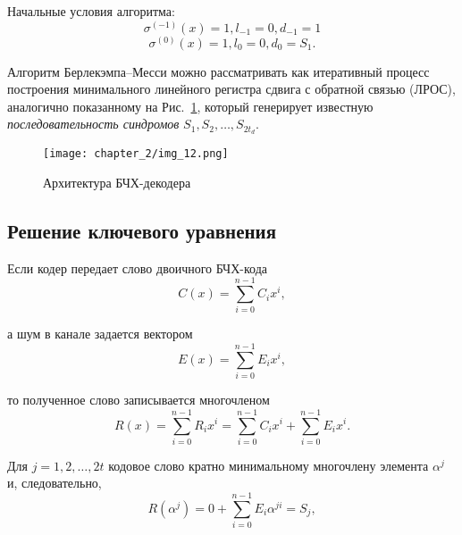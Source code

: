 Начальные условия алгоритма:
$$\sigma^{(-1)}(x)=1, l_{-1}=0, d_{-1}=1$$
$$\sigma^{(0)}(x)=1, l_0=0, d_{0}=S_1.$$

Алгоритм Берлекэмпа–Месси можно рассматривать как итеративный процесс построения минимального линейного
регистра сдвига с обратной связью (ЛРОС), аналогично показанному на Рис.~\ref{img_12}, который
генерирует известную \textit{последовательность синдромов} $S_1, S_2, \ldots, S_{2t_d}$.

\begin{figure}[htbp]
\begin{center}
\texttt{[image: chapter\_2/img\_12.png]}
\end{center}
\caption{Архитектура БЧХ-декодера}
\label{img_12}
\end{figure}

\subsection{Решение ключевого уравнения}
%
Если кодер передает слово двоичного БЧХ-кода
$$C(x)=\sum\limits_{i=0}^{n-1} C_i x^i,$$

а шум в канале задается вектором
$$E(x)=\sum\limits_{i=0}^{n-1} E_i x^i,$$

то полученное слово записывается многочленом
$$R(x)=\sum\limits_{i=0}^{n-1} R_i x^i=\sum\limits_{i=0}^{n-1} C_i x^i+\sum\limits_{i=0}^{n-1} E_i x^i.$$

Для $j=1, 2, \ldots, 2t$ кодовое слово кратно минимальному многочлену элемента $\alpha^j$ и, следовательно,
$$R(\alpha^j)=0+\sum\limits_{i=0}^{n-1} E_i \alpha^{ji}=S_j,$$

